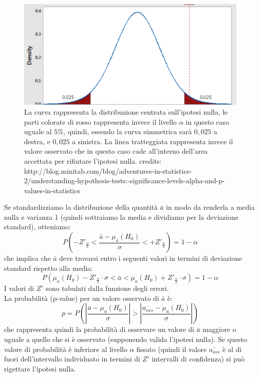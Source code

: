 \documentclass[]{article}
\begin{document}
\begin{figure}
\centering
\includegraphics[scale= 0.3]{Immagini/distro-pvalue.png}
\caption{La curva rappresenta la distribuzione centrata sull'ipotesi nulla, le parti colorate di rosso rappresenta invece il livello $\alpha$ in questo caso uguale al $5\%$, quindi, essendo la curva simmetrica sarà $0,025$ a destra, e $0,025$ a sinistra. La linea tratteggiata rappresenta invece il valore osservato che in questo caso cade all'interno dell'area accettata per rifiutare l'ipotesi nulla.
credits: http://blog.minitab.com/blog/adventures-in-statistics-2/understanding-hypothesis-tests:-significance-levels-alpha-and-p-values-in-statistics}
\label{fig: distro-pvalue}
\end{figure}
Se standardizziamo la distribuzione della quantità $\bar{a}$ in modo da renderla a media nulla e varianza 1 (quindi sottraiamo la media e dividiamo per la deviazione standard), otteniamo:
\begin{equation}
P\left(-Z'_{\frac{\alpha}{2}}< \frac{\bar{a} - \mu_a(H_0)}{\sigma} < +Z'_{\frac{\alpha}{2}}\right) = 1 - \alpha
\end{equation}
che implica che $\bar{a}$ deve trovarsi entro i seguenti valori in termini di deviazione standard rispetto alla media:
\begin{equation}
\label{eq: prob-interna}
P\left(\mu_a(H_0) - Z'_{\frac{\alpha}{2}} \cdot \sigma < \bar{a} < \mu_a(H_0) + Z'_{\frac{\alpha}{2}} \cdot \sigma \right) = 1 - \alpha
\end{equation}
I valori di $Z'$ sono tabulati dalla funzione degli errori.\\
La probabilità (p-value) per un valore osservato di $\bar{a}$ è:
\begin{equation}
p = P\left( \left| \frac{\bar{a} - \mu_a(H_0)}{\sigma} \right| > \left| \frac{\bar{a_{oss}} - \mu_a(H_0)}{\sigma} \right| \right)
\end{equation}
che rappresenta quindi la probabilità di osservare un valore di $\bar{a}$ maggiore o uguale a quello che si è osservato (supponendo valida l'ipotesi nulla). Se questo valore di probabilità è inferiore al livello $\alpha$ fissato (quindi il valore $\bar{a_{oss}}$ è al di fuori dell'intervallo individuato in termini di $Z'$ intervalli di confidenza) si può rigettare l'ipotesi nulla.
\end{document}
